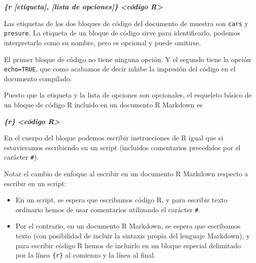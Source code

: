 \documentclass[
  title=normal,
  notoc,
  bib=normal]{mnye}
\newenvironment{Shaded}{\begin{snugshade}}{\end{snugshade}}
\newcommand{\InformationTok}[1]{\textcolor[rgb]{0.56,0.35,0.01}{\textbf{\textit{#1}}}}
\begin{document}
\begin{Shaded}
\begin{Highlighting}[]
\InformationTok{\textasciigrave{}\textasciigrave{}\textasciigrave{}\{r [etiqueta], [lista de opciones]\}}
\InformationTok{\textless{}código R\textgreater{}}
\InformationTok{\textasciigrave{}\textasciigrave{}\textasciigrave{}}
\end{Highlighting}
\end{Shaded}

Las etiquetas de los dos bloques de código del documento de muestra son \texttt{cars} y \texttt{presure}. La etiqueta de un bloque de código sirve para identificarlo, podemos interpretarlo como su nombre, pero es opcional y puede omitirse.

El primer bloque de código no tiene ninguna opción. Y el segundo tiene la opción \texttt{echo=TRUE}, que como acabamos de decir inhibe la impresión del código en el documento compilado.

Puesto que la etiqueta y la lista de opciones son opcionales, el esqueleto básico de un bloque de código \textsf{R} incluido en un documento R Markdown es

\begin{Shaded}
\begin{Highlighting}[]
\InformationTok{\textasciigrave{}\textasciigrave{}\textasciigrave{}\{r\}}
\InformationTok{\textless{}código R\textgreater{}}
\InformationTok{\textasciigrave{}\textasciigrave{}\textasciigrave{}}
\end{Highlighting}
\end{Shaded}

En el cuerpo del bloque podemos escribir instrucciones de \textsf{R} igual que si estuvieramos escribiendo en un script (incluidos comentarios precedidos por el carácter \texttt{\#}).

Notar el cambio de enfoque al escribir en un documento R Markdown respecto a escribir en un script:

\begin{itemize}
\item
  En un script, se espera que escribamos código \textsf{R}, y para escribir texto ordinario hemos de usar comentarios utilizando el carácter \texttt{\#}.
\item
  Por el contrario, en un documento R Markdown, se espera que escribamos texto (con posibilidad de incluir la sintaxis propia del lenguaje Markdown), y para escribir código \textsf{R} hemos de incluirlo en un bloque especial delimitado por la línea \texttt{\textasciigrave{}\textasciigrave{}\textasciigrave{}\{r\}} al comienzo y la línea \texttt{\textasciigrave{}\textasciigrave{}\textasciigrave{}} al final.
\end{itemize}
\end{document}
